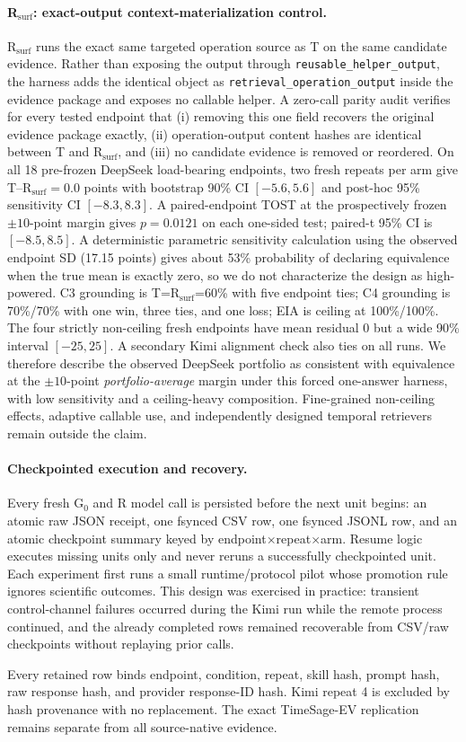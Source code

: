 \paragraph{R$_{\mathrm{surf}}$: exact-output context-materialization control.}
R$_{\mathrm{surf}}$ runs the exact same targeted operation source as T on the same candidate evidence. Rather than exposing the output through \texttt{reusable\_helper\_output}, the harness adds the identical object as \texttt{retrieval\_operation\_output} inside the evidence package and exposes no callable helper. A zero-call parity audit verifies for every tested endpoint that (i) removing this one field recovers the original evidence package exactly, (ii) operation-output content hashes are identical between T and R$_{\mathrm{surf}}$, and (iii) no candidate evidence is removed or reordered. On all 18 pre-frozen DeepSeek load-bearing endpoints, two fresh repeats per arm give T--R$_{\mathrm{surf}}=0.0$ points with bootstrap 90\% CI $[-5.6,5.6]$ and post-hoc 95\% sensitivity CI $[-8.3,8.3]$. A paired-endpoint TOST at the prospectively frozen $\pm10$-point margin gives $p=0.0121$ on each one-sided test; paired-t 95\% CI is $[-8.5,8.5]$. A deterministic parametric sensitivity calculation using the observed endpoint SD (17.15 points) gives about 53\% probability of declaring equivalence when the true mean is exactly zero, so we do not characterize the design as high-powered. C3 grounding is T=R$_{\mathrm{surf}}$=60\% with five endpoint ties; C4 grounding is 70\%/70\% with one win, three ties, and one loss; EIA is ceiling at 100\%/100\%. The four strictly non-ceiling fresh endpoints have mean residual 0 but a wide 90\% interval $[-25,25]$. A secondary Kimi alignment check also ties on all runs. We therefore describe the observed DeepSeek portfolio as consistent with equivalence at the $\pm10$-point \emph{portfolio-average} margin under this forced one-answer harness, with low sensitivity and a ceiling-heavy composition. Fine-grained non-ceiling effects, adaptive callable use, and independently designed temporal retrievers remain outside the claim.

\paragraph{Checkpointed execution and recovery.}
Every fresh G$_0$ and R model call is persisted before the next unit begins: an atomic raw JSON receipt, one fsynced CSV row, one fsynced JSONL row, and an atomic checkpoint summary keyed by endpoint$\times$repeat$\times$arm. Resume logic executes missing units only and never reruns a successfully checkpointed unit. Each experiment first runs a small runtime/protocol pilot whose promotion rule ignores scientific outcomes. This design was exercised in practice: transient control-channel failures occurred during the Kimi run while the remote process continued, and the already completed rows remained recoverable from CSV/raw checkpoints without replaying prior calls.

Every retained row binds endpoint, condition, repeat, skill hash, prompt hash, raw response hash, and provider response-ID hash. Kimi repeat 4 is excluded by hash provenance with no replacement. The exact TimeSage-EV replication remains separate from all source-native evidence.
